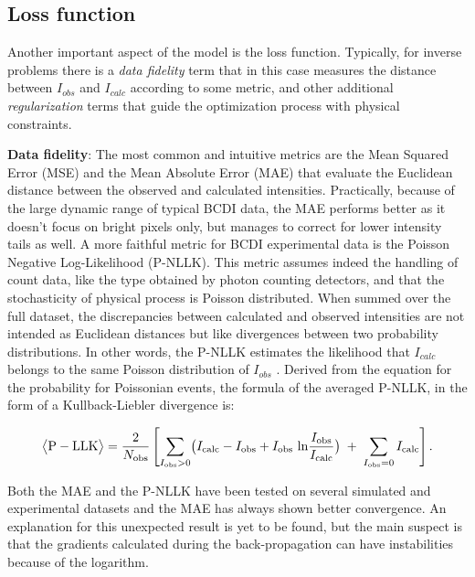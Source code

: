 \subsection{Loss function}
Another important aspect of the model is the loss function. Typically, for inverse problems there is a \textit{data fidelity}
term that in this case measures the distance between $I_{obs}$ and $ I_{calc}$ according to some metric, and other additional 
\textit{regularization} terms that guide the optimization process with physical constraints. 

\textbf{Data fidelity}: 
The most common and intuitive metrics are the Mean Squared Error (MSE) and the Mean Absolute Error (MAE) that evaluate 
the Euclidean distance between the observed and calculated intensities. Practically, because of the large dynamic range 
of typical BCDI data, the MAE performs better as it doesn't focus on bright pixels only, but manages to correct for lower 
intensity tails as well. 
A more faithful metric for BCDI experimental data is the Poisson Negative Log-Likelihood (P-NLLK). This metric assumes 
indeed the handling of count data, like the type obtained by photon counting detectors, and that the stochasticity of physical 
process is Poisson distributed. When summed over the full dataset, the discrepancies between calculated and observed 
intensities are not intended as Euclidean distances but like divergences between two probability distributions. In other 
words, the P-NLLK estimates the likelihood that $I_{calc}$ belongs to the same Poisson distribution of $I_{obs}$ \cite{Thibault_2012}. 
Derived from the equation for the probability for Poissonian events, the formula of the averaged P-NLLK, in the form of 
a Kullback-Liebler divergence is: 

\begin{equation}
    \bigl\langle \mathrm{P-LLK}\bigr\rangle
    = \frac{2}{N_{\mathrm{obs}}}
    \left[
      \sum_{I_{\rm obs}>0}
        \bigl(
          I_{\rm calc} - I_{\rm obs}
          + I_{\rm obs}\,\ln\!\frac{I_{\rm obs}}{I_{\rm calc}}
        \bigr)
      \;+\;
      \sum_{I_{\rm obs}=0} I_{\rm calc}
    \right].
    \label{eq:poisson_kl}
\end{equation}
    

Both the MAE and the P-NLLK have been tested on several simulated and experimental datasets and the MAE has always shown 
better convergence. An explanation for this unexpected result is yet to be found, but the main suspect is that the gradients 
calculated during the back-propagation can have instabilities because of the logarithm. 

